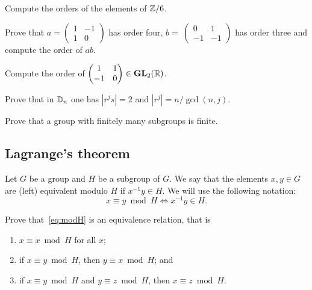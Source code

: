 \begin{exercise}
        Compute the orders of the elements of $\mathbb{Z}/6$.
\end{exercise}       

\begin{exercise}
        Prove that $a=\begin{pmatrix}1&-1\\1&0\end{pmatrix}$ has order four, $b=\
        \begin{pmatrix}0&1\\-1&-1\end{pmatrix}$ has order three and 
        compute the order of $ab$.%
\end{exercise}
                                
\begin{exercise}
        Compute the order of 
        $\begin{pmatrix}1&1\\-1&0\end{pmatrix}\in\mathbf{GL}_2(\mathbb{R})$.
\end{exercise}
                                
\begin{exercise}
        Prove that in $\mathbb{D}_n$ one has 
        $|r^js|=2$ and $|r^j|=n/\gcd(n,j)$.
\end{exercise}
                                
\begin{exercise}
        Prove that a group with finitely many subgroups
        is finite. 
\end{exercise}




\subsection{Lagrange's theorem}

Let $G$ be a group and $H$ be a subgroup of $G$. We say that the elements $x,y\in
G$ are (left) equivalent modulo $H$ if $x^{-1}y\in H$.
We will use the following notation:
\begin{equation}
\label{eq:modH}
    x\equiv y\bmod
    H\Longleftrightarrow x^{-1}y\in H.
\end{equation}

\begin{exercise}
    Prove that~\eqref{eq:modH} is an equivalence relation, that
    is 
    \begin{enumerate}
    \item $x\equiv x\bmod H$ for all $x$; 
    \item if $x\equiv y\bmod H$, then $y\equiv x\bmod H$; and 
    \item if $x\equiv y\bmod H$ and $y\equiv z\bmod H$, then $x\equiv z\bmod H$.
    \end{enumerate}
\end{exercise}

